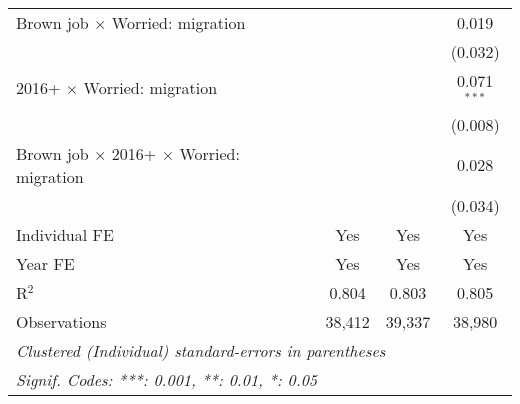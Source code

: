 \begin{table}[htbp]
\begin{tabular}{lccc}
      Brown job $\times$ Worried: migration                               &             &             & 0.019\\   
                                                                          &             &             & (0.032)\\   
      2016+ $\times$ Worried: migration                                   &             &             & 0.071$^{***}$\\   
                                                                          &             &             & (0.008)\\   
      Brown job $\times$ 2016+ $\times$ Worried: migration                &             &             & 0.028\\   
                                                                          &             &             & (0.034)\\   
      Individual FE                                                       & Yes         & Yes         & Yes\\  
      Year FE                                                             & Yes         & Yes         & Yes\\  
      R$^2$                                                               & 0.804       & 0.803       & 0.805\\  
      Observations                                                        & 38,412      & 39,337      & 38,980\\  
      \midrule \midrule
      \multicolumn{4}{l}{\emph{Clustered (Individual) standard-errors in parentheses}}\\
      \multicolumn{4}{l}{\emph{Signif. Codes: ***: 0.001, **: 0.01, *: 0.05}}\\
   \end{tabular}
\end{table}


